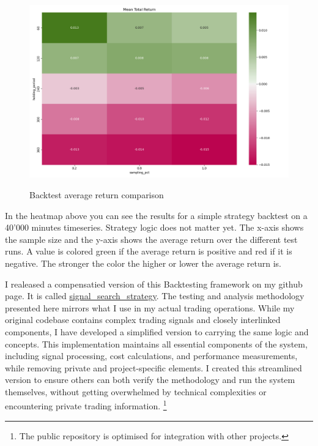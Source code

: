 \documentclass[12pt]{article}
\begin{document}
\newpage







\begin{figure}[H]
    \centering
    \includegraphics[width=\textwidth,height=0.7\textheight,keepaspectratio]{imgs/showcase_market_simulation.png}
    \label{fig:bullish_outliers_comparison}
    \caption{Backtest average return comparison}
\end{figure}

In the heatmap above you can see the results for a simple strategy backtest on a 40'000 minutes timeseries. Strategy logic does not matter yet. The x-axis shows the sample size and the y-axis shows the average return over the different test runs.
A value is colored green if the average return is positive and red if it is negative. The stronger the color the higher or lower the average return is.


I realeased a compensatied version of this Backtesting framework on my github page. It is called \href{https://github.com/AJslashTracey/signal_search_strategy}{signal\_search\_strategy}. 
The testing and analysis methodology presented here mirrors what I use in my actual trading operations. While my original codebase contains complex trading signals and closely interlinked components, I have developed a simplified version to carrying the same logic and concepts. This implementation maintains all essential components of the system, including signal processing, cost calculations, and performance measurements, while removing private and project-specific elements. I created this streamlined version to ensure others can both verify the methodology and run the system themselves, without getting overwhelmed by technical complexities or encountering private trading information. \footnote{The public repository is optimised for integration with other projects.}
\end{document}
